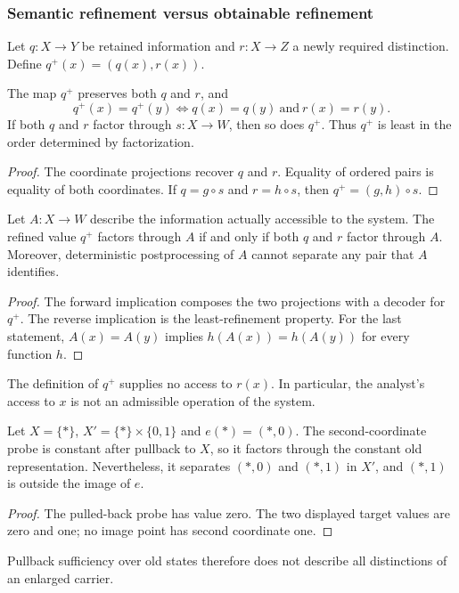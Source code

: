 \subsubsection{Semantic refinement versus obtainable refinement}

Let $q:X\to Y$ be retained information and $r:X\to Z$ a newly
required distinction. Define $q^+(x)=(q(x),r(x))$.

\begin{theorem}\label{thm:least-refinement}
The map $q^+$ preserves both $q$ and $r$, and
\[
 q^+(x)=q^+(y)\iff q(x)=q(y)\ \text{and}\ r(x)=r(y).
\]
If both $q$ and $r$ factor through $s:X\to W$, then so does $q^+$.
Thus $q^+$ is least in the order determined by factorization.
\end{theorem}
\begin{proof}
The coordinate projections recover $q$ and $r$. Equality of ordered
pairs is equality of both coordinates. If $q=g\circ s$ and
$r=h\circ s$, then $q^+=(g,h)\circ s$.
\end{proof}

\begin{theorem}\label{thm:obtainable-refinement}
Let $A:X\to W$ describe the information actually accessible to the
system. The refined value $q^+$ factors through $A$ if and only if
both $q$ and $r$ factor through $A$. Moreover, deterministic
postprocessing of $A$ cannot separate any pair that $A$ identifies.
\end{theorem}
\begin{proof}
The forward implication composes the two projections with a decoder
for $q^+$. The reverse implication is the least-refinement property.
For the last statement, $A(x)=A(y)$ implies $h(A(x))=h(A(y))$ for
every function $h$.
\end{proof}
The definition of $q^+$ supplies no access to $r(x)$. In particular,
the analyst's access to $x$ is not an admissible operation of the system.

\begin{example}
\label{ex:carrier-extension}
Let $X=\{*\}$, $X'=\{*\}\times\{0,1\}$ and $e(*)=(*,0)$.
The second-coordinate probe is constant after pullback to $X$, so
it factors through the constant old representation. Nevertheless,
it separates $(*,0)$ and $(*,1)$ in $X'$, and $(*,1)$ is outside
the image of $e$.
\end{example}
\begin{proof}
The pulled-back probe has value zero. The two displayed target values
are zero and one; no image point has second coordinate one.
\end{proof}
Pullback sufficiency over old states therefore does not describe all
distinctions of an enlarged carrier.
